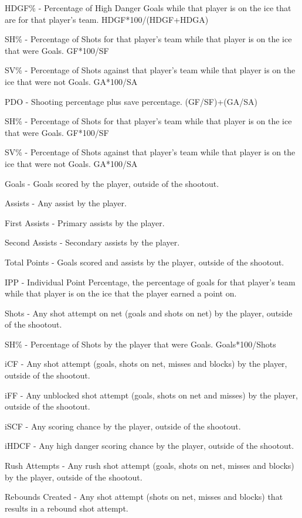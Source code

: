 \documentclass[12pt]{article}
\begin{document}
HDGF\% - Percentage of High Danger Goals while that player is on the ice that are for that player's team. HDGF*100/(HDGF+HDGA)

SH\% - Percentage of Shots for that player's team while that player is on the ice that were Goals. GF*100/SF

SV\% - Percentage of Shots against that player's team while that player is on the ice that were not Goals. GA*100/SA

PDO - Shooting percentage plus save percentage. (GF/SF)+(GA/SA)

SH\% - Percentage of Shots for that player's team while that player is on the ice that were Goals. GF*100/SF

SV\% - Percentage of Shots against that player's team while that player is on the ice that were not Goals. GA*100/SA

Goals - Goals scored by the player, outside of the shootout.

Assists - Any assist by the player.

First Assists - Primary assists by the player.

Second Assists - Secondary assists by the player.

Total Points - Goals scored and assists by the player, outside of the shootout.

IPP - Individual Point Percentage, the percentage of goals for that player's team while that player is on the ice that the 
player earned a point on. 

Shots - Any shot attempt on net (goals and shots on net) by the player, outside of the shootout.

SH\% - Percentage of Shots by the player that were Goals. Goals*100/Shots

iCF - Any shot attempt (goals, shots on net, misses and blocks) by the player, outside of the shootout.

iFF - Any unblocked shot attempt (goals, shots on net and misses) by the player, outside of the shootout.

iSCF - Any scoring chance by the player, outside of the shootout.

iHDCF - Any high danger scoring chance by the player, outside of the shootout.

Rush Attempts - Any rush shot attempt (goals, shots on net, misses and blocks) by the player, outside of the shootout.

Rebounds Created - Any shot attempt (shots on net, misses and blocks) that results in a rebound shot attempt.
\end{document}
